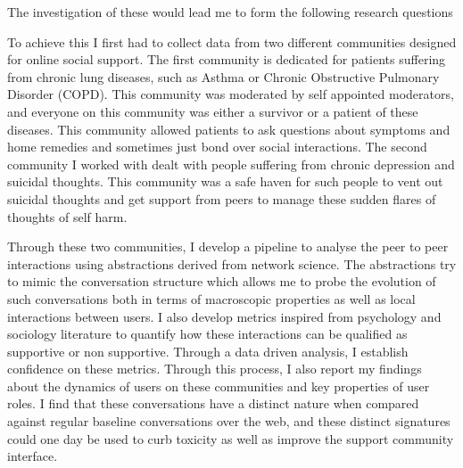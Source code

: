 The investigation of these would lead me to form the following research questions 

\noindent{}

\noindent{}
\noindent{}
\noindent{}
\vspace{1cm}

To achieve this I first had to collect data from two different communities designed for online social support. The first community is dedicated for patients suffering from chronic lung diseases, such as Asthma or Chronic Obstructive Pulmonary Disorder (COPD). This community was moderated by self appointed moderators, and everyone on this community was either a survivor or a patient of these diseases. This community allowed patients to ask questions about symptoms and home remedies and sometimes just bond over social interactions. The second community I worked with dealt with people suffering from chronic depression and suicidal thoughts. This community was a safe haven for such people to vent out suicidal thoughts and get support from peers to manage these sudden flares of thoughts of self harm. 

Through these two communities, I develop a pipeline to analyse the peer to peer interactions using abstractions derived from network science. The abstractions try to mimic the conversation structure which allows me to probe the evolution of such conversations both in terms of macroscopic properties as well as local interactions between users. I also develop metrics inspired from psychology and sociology literature to quantify how these interactions can be qualified as supportive or non supportive. Through a data driven analysis, I establish confidence on these metrics. Through this process, I also report my findings about the dynamics of users on these communities and key properties of user roles. I find that these conversations have a distinct nature when compared against regular baseline conversations over the web, and these distinct signatures could one day be used to curb toxicity as well as improve the support community interface.

